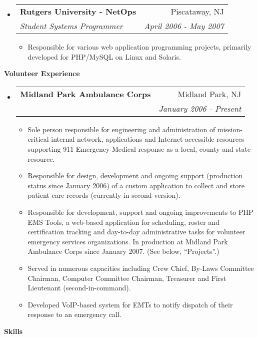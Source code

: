 \documentclass[letterpaper,11pt]{article}
\makeatletter
\newcommand{\resitem}[1]{\item #1 \vspace{-2pt}}
\newcommand{\resheading}[1]{{\large \colorbox{mygrey}{\begin{minipage}{\textwidth}{\textbf{#1 \vphantom{p\^{E}}}}\end{minipage}}}}
\newcommand{\ressubheading}[4]{
\begin{tabular*}{7.0in}{l@{\extracolsep{\fill}}r}
		\textbf{#1} & #2 \\
		\textit{#3} & \textit{#4} \\
\end{tabular*}\vspace{-6pt}}
\makeatother
\begin{document}
\begin{itemize}
\item
	\ressubheading{Rutgers University - NetOps}{Piscataway, NJ}{Student Systems Programmer}{April 2006 - May 2007}
	\begin{itemize}
		\resitem{Responsible for various web application programming projects, primarily developed for
                  PHP/MySQL on Linux and Solaris.}
	\end{itemize}

\end{itemize}

\pagebreak

\resheading{Volunteer Experience}
\begin{itemize}
\item
        \ressubheading{Midland Park Ambulance Corps}{Midland Park, NJ}{}{January 2006 - Present}
        \begin{itemize}
                \resitem{Sole person responsible for engineering and administration of
                  mission-critical internal network, applications and
                  Internet-accessible resources supporting 911 Emergency
                  Medical response as a local, county and state resource.}
                \resitem{Responsible for design, development and ongoing support (production
                  status since January 2006) of a custom application to
                  collect and store patient care records (currently in second version).}
                \resitem{Responsible for development, support and ongoing
                  improvements to PHP EMS Tools, a web-based application for
                  scheduling, roster and certification tracking and day-to-day
                administrative tasks for volunteer emergency services
                organizations. In production at Midland Park Ambulance Corps
                since January 2007. (See below, ``Projects''.)}
                \resitem{Served in numerous capacities including Crew Chief,
                  By-Laws Committee Chairman, Computer Committee Chairman,
                  Treasurer and First Lieutenant (second-in-command).}
                \resitem{Developed VoIP-based system for EMTs to notify
                  dispatch of their response to an emergency call.}
        \end{itemize}
\end{itemize}

\resheading{Skills}
\end{document}
